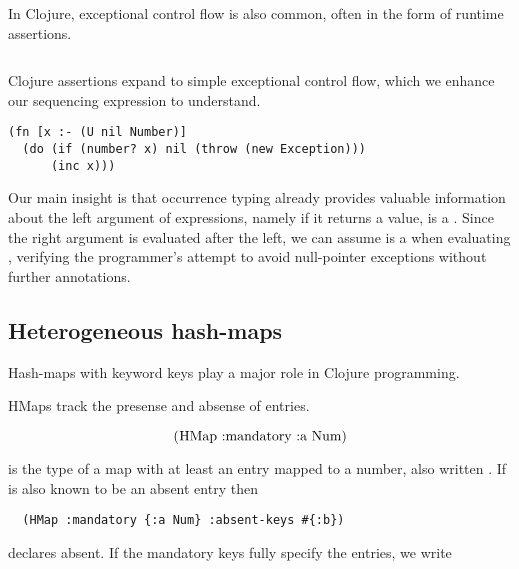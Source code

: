 In Clojure, exceptional control flow is also common, often in the form of
runtime assertions. 



\begin{exmp}
\begin{listing}
\inputminted[firstline=5,lastline=7]{clojure}{code/demo/src/demo/do.clj}
\end{listing}
\end{exmp}

Clojure assertions expand to simple exceptional control flow,
which we enhance our sequencing \doliteral{} expression to understand.

\begin{exmp}
  \begin{verbatim}
(fn [x :- (U nil Number)]
  (do (if (number? x) nil (throw (new Exception)))
      (inc x)))
  \end{verbatim}
\end{exmp}

Our main insight is that occurrence typing already provides
valuable information about the left argument of \doliteral{} expressions,
namely if it returns a value,  is a .
Since the right argument is evaluated after the left, we can assume
 is a  when evaluating , verifying
the programmer's attempt to avoid null-pointer exceptions without further annotations.

\subsection{Heterogeneous hash-maps}

Hash-maps with keyword keys play a major role in Clojure programming.

HMaps track the presense and absense of entries.

$$
\clj{(HMap :mandatory {:a Num})} 
$$

is the type of a map with at least an  entry mapped to a number,
also written . If  is also known to be an absent entry
then

\smallskip
\begin{verbatim}
  (HMap :mandatory {:a Num} :absent-keys #{:b})
\end{verbatim}

declares  absent. If the mandatory keys fully specify the
entries, we write

